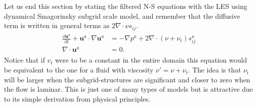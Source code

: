 Let us end this section by stating the filtered N-S equations with the LES using 
dynamical Smagorinsky subgrid scale model, and remember that the diffusive term is written 
in general terms as $2\nabla \cdot \nu s_{ij}$.  
%
\begin{align}
    \begin{split}
        \frac{\partial \mathbf{u}^a}{\partial t} + \mathbf{u}^a\cdot \nabla\mathbf{u}^a
        &= -\nabla p^a +2\nabla \cdot (\nu + \nu_t) s^a_{ij} \\
        \nabla \cdot \mathbf{u}^a &= 0.
    \end{split}
	\label{eq:NSLES}
\end{align}
%
Notice that if $v_t$ were to be a constant in the entire domain this equation would 
be equivalent to the one for a fluid with viscosity $\nu'= \nu + \nu_t$. The idea is 
that $\nu_t$ will be larger when the subgrid-structures are significant and closer to zero 
when the flow is laminar. This is just one of many types of models but is attractive due to its
simple derivation from physical principles.



